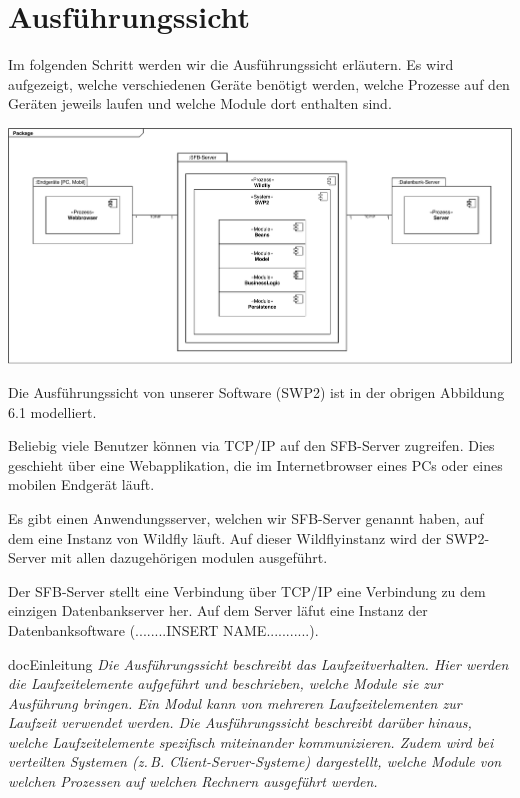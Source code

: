 \documentclass[enabledeprecatedfontcommands,fontsize=12pt,paper=a4,twoside]{scrartcl}
\begin{document}
\section{Ausführungssicht}

\label{sec:ausfuehrung}


{ Im folgenden Schritt werden wir die Ausführungssicht erläutern. Es wird aufgezeigt, welche verschiedenen Geräte benötigt werden, welche Prozesse auf den Geräten jeweils laufen und welche Module dort enthalten sind.
}


\includegraphics[scale=0.5]{UML/06Ausfuehrungssicht.pdf}


{ Die Ausführungssicht von unserer Software (SWP2) ist in der obrigen Abbildung 6.1 modelliert.

Beliebig viele Benutzer können via TCP/IP auf den SFB-Server zugreifen. Dies geschieht über eine Webapplikation, die im Internetbrowser eines PCs oder eines mobilen Endgerät läuft.

Es gibt einen Anwendungsserver, welchen wir SFB-Server genannt haben, auf dem eine Instanz von Wildfly läuft. Auf dieser Wildflyinstanz wird der SWP2-Server mit allen dazugehörigen modulen ausgeführt.

Der SFB-Server stellt eine Verbindung über TCP/IP eine Verbindung zu dem einzigen Datenbankserver her. Auf dem Server läfut eine Instanz der Datenbanksoftware (........INSERT NAME...........).

}

docEinleitung
{\it
Die Ausführungssicht beschreibt das Laufzeitverhalten. Hier
werden die Laufzeitelemente aufgeführt und beschrieben, welche Module
sie zur Ausführung bringen. Ein Modul kann von mehreren
Laufzeitelementen zur Laufzeit verwendet werden. Die Ausführungssicht
beschreibt darüber hinaus, welche Laufzeitelemente spezifisch
miteinander kommunizieren. Zudem wird bei verteilten Systemen
(z.\,B. Client-Server-Systeme) dargestellt, welche Module von welchen
Prozessen auf welchen Rechnern ausgeführt werden.}
\end{document}
